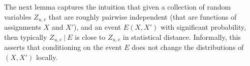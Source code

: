 
The next lemma captures the intuition that 
given a collection of random variables $Z_{u,v}$ that are roughly pairwise independent (that are functions of assignments $X$ and $X'$), and an event $E(X,X')$ with significant 
probability, then typically $Z_{u,v}~|~E$ 
is close to $Z_{u,v}$ in statistical distance. Informally, this asserts that 
conditioning on the event $E$ does not 
change the distributions of $(X, X')$ locally.


